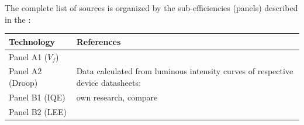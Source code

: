 \documentclass[10pt]{article}
\begin{document}
The complete list of sources is organized by the sub-efficiencies (panels) described in the :

\begin{table}[h!]
    \begin{tabularx}{\textwidth}{|l|X|}
    \hline
    \textbf{Technology} & \textbf{References} \\
    \hline
    Panel A1 ($V_f$) & \cite{nichia2001data}\cite{lumi2002data}\cite{gen2005data}\cite{candlepwr2005data}\cite{lumi2006data}\cite{lumi2007data}\cite{nichia2008data}\cite{lumi2008data}\cite{osram2008data}\cite{jeong2011high}\cite{osram2012data}\cite{osram2013data}\cite{osram2014data} \newline \cite{lumi2016data_1}\cite{lumi2016data_2}\cite{epistar2017data}\cite{osram2017data_1}\cite{osram2017data_2}\cite{samsung2017data}\cite{samsung2018data}\cite{osram2018data}\cite{epistar2018data}\cite{lumi2019data} \\
    \hline
    Panel A2 (Droop) & Data calculated from luminous intensity curves of respective device datasheets: \cite{datasheet_osram_topled}\cite{osram2008data}\cite{osram2008gdplus}\cite{osram2018csp}\cite{datasheet_lumileds_lux1}\cite{lumi2008data}\cite{lumi2016data_1}\cite{lumi2016data_2}\cite{samsung2018data} \\
    \hline
    Panel B1 (IQE) & own research, compare \cite{zenodo_weinold_led_history} \newline
\cite{doe_ssl_multiyear_2006}\cite{doe_ssl_multiyear_2007}\cite{doe_ssl_multiyear_2008}\cite{doe_ssl_multiyear_2009}\cite{doe_ssl_multiyear_2010}\cite{doe_ssl_multiyear_2011}\cite{doe_ssl_multiyear_2012}\cite{doe_ssl_multiyear_2013}\cite{doe_ssl_multiyear_2014}\cite{doe_ssl_rnd_2015}\cite{doe_ssl_rnd_2016} \\
    \hline
    Panel B2 (LEE) & \cite{lee2005analysis}\cite{krames2007status}\cite{Jang2004}\cite{Horng2013}\cite{Liao2010}\cite{HungWenHuang2005}\cite{Leem2007}\cite{Huang2008}\cite{Wang2009}\cite{Huh2003}\cite{Horng2008}\cite{Gao2008}\cite{Chang2003}\cite{Zhou2012} \newline \cite{ChunJuTun2006}\cite{Hua2009}\cite{Matioli2010}
\cite{lee2005analysis}\cite{Zhu2015}\cite{Ding2015}\cite{Taki2019}\cite{Shchekin2006}\cite{Hu2016}\cite{Horng2010}\cite{Lin2016}\cite{Yue2018}\cite{Zhao2012}\cite{Zhu2015}\newline \cite{Ding2015}\cite{wierer2001high}\cite{Steigerwald2002}\cite{DaeSeobHan2006}\cite{Wang2006}\cite{Lee2007}\cite{Shen2007}\cite{Huang2006}\cite{Zhmakin2011} \\
    \hline
    \end{tabularx}
\end{table}

\newpage


\end{document}
